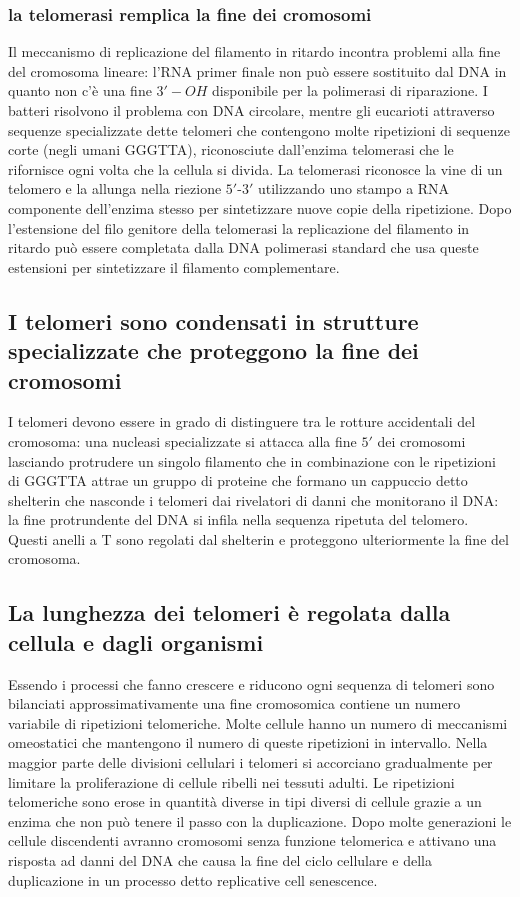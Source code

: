 \subsubsection{la telomerasi remplica la fine dei cromosomi}
Il meccanismo di replicazione del filamento in ritardo incontra problemi alla fine del cromosoma lineare: l'RNA primer finale non pu\`o essere sostituito dal DNA in quanto non c'\`e una
fine $3'-OH$ disponibile per la polimerasi di riparazione. I batteri risolvono il problema con DNA circolare, mentre gli eucarioti attraverso sequenze specializzate dette telomeri
che contengono molte ripetizioni di sequenze corte (negli umani GGGTTA), riconosciute dall'enzima telomerasi che le rifornisce ogni volta che la cellula si divida. La telomerasi 
riconosce la vine di un telomero e la allunga nella riezione $5'$-$3'$ utilizzando uno stampo a RNA componente dell'enzima stesso per sintetizzare nuove copie della ripetizione. Dopo
l'estensione del filo genitore della telomerasi la replicazione del filamento in ritardo pu\`o essere completata dalla DNA polimerasi standard che usa queste estensioni per sintetizzare
il filamento complementare. 
\subsection{I telomeri sono condensati in strutture specializzate che proteggono la fine dei cromosomi}
I telomeri devono essere in grado di distinguere tra le rotture accidentali del cromosoma: una nucleasi specializzate si attacca alla fine $5'$ dei cromosomi lasciando protrudere un 
singolo filamento che in combinazione con le ripetizioni di GGGTTA attrae un gruppo di proteine che formano un cappuccio detto shelterin che nasconde i telomeri dai rivelatori di 
danni che monitorano il DNA: la fine protrundente del DNA si infila nella sequenza ripetuta del telomero. Questi anelli a T sono regolati dal shelterin e proteggono ulteriormente la 
fine del cromosoma. 
\subsection{La lunghezza dei telomeri \`e regolata dalla cellula e dagli organismi}
Essendo i processi che fanno crescere e riducono ogni sequenza di telomeri sono bilanciati approssimativamente una fine cromosomica contiene un numero variabile di ripetizioni 
telomeriche. Molte cellule hanno un numero di meccanismi omeostatici che mantengono il numero di queste ripetizioni in intervallo. Nella maggior parte delle divisioni cellulari i 
telomeri si accorciano gradualmente per limitare la proliferazione di cellule ribelli nei tessuti adulti. Le ripetizioni telomeriche sono erose in quantit\`a diverse in tipi diversi di 
cellule grazie a un enzima che non pu\`o tenere il passo con la duplicazione. Dopo molte generazioni le cellule discendenti avranno cromosomi senza funzione telomerica e attivano una
risposta ad danni del DNA che causa la fine del ciclo cellulare e della duplicazione in un processo detto replicative cell senescence. 
